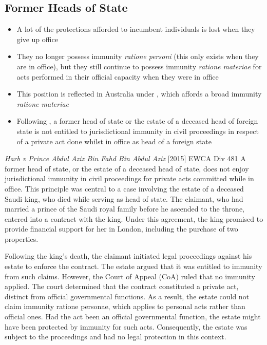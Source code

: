 \subsection{Former Heads of State}
\begin{itemize}
    \item A lot of the protections afforded to incumbent individuals is lost when they give up office
    \item They no longer possess immunity \textit{ratione personi} (this only exists when they are in office), but they still continue to possess immunity \textit{ratione materiae} for acts performed in their official capacity when they were in office
    \item This position is reflected in Australia under , which affords a broad immunity \textit{ratione materiae}
    \item Following , a former head of state or the estate of a deceased head of foreign state is not entitled to jurisdictional immunity in civil proceedings in respect of a private act done whilst in office as head of a foreign state
\end{itemize}

\begin{casedetails}{\textit{Harb v Prince Abdul Aziz Bin Fahd Bin Abdul Aziz} [2015] EWCA Div 481}
    \flushleft
    A former head of state, or the estate of a deceased head of state, does not enjoy jurisdictional immunity in civil proceedings for private acts committed while in office. This principle was central to a case involving the estate of a deceased Saudi king, who died while serving as head of state. The claimant, who had married a prince of the Saudi royal family before he ascended to the throne, entered into a contract with the king. Under this agreement, the king promised to provide financial support for her in London, including the purchase of two properties.

    \vspace{\baselineskip}

    Following the king's death, the claimant initiated legal proceedings against his estate to enforce the contract. The estate argued that it was entitled to immunity from such claims. However, the Court of Appeal (CoA) ruled that no immunity applied. The court determined that the contract constituted a private act, distinct from official governmental functions. As a result, the estate could not claim immunity ratione personae, which applies to personal acts rather than official ones. Had the act been an official governmental function, the estate might have been protected by immunity for such acts. Consequently, the estate was subject to the proceedings and had no legal protection in this context.
\end{casedetails}

